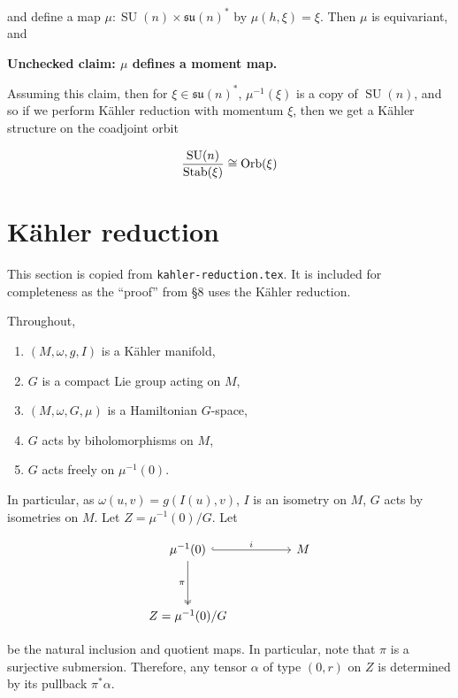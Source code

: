 \documentclass{article}
\DeclareMathOperator{\SU}{SU}
\newcommand{\su}{\mathfrak{su}}
\begin{document}
and define a map \(\mu : \SU(n) \times \su(n)^*\) by \(\mu(h, \xi) = \xi\). Then \(\mu\) is equivariant, and

\textbf{Unchecked claim: \(\mu\) defines a moment map.}

Assuming this claim, then for \(\xi \in \su(n)^*\), \(\mu^{-1}(\xi)\) is a copy of \(\SU(n)\), and so if we perform K\"ahler reduction with momentum \(\xi\), then we get a K\"ahler structure on the coadjoint orbit

\[\frac{\SU(n)}{\Stab(\xi)} \cong \Orb(\xi)\]

\appendix

\section{K\"ahler reduction}

This section is copied from \texttt{kahler-reduction.tex}. It is included for completeness as the ``proof'' from \S 8 uses the K\"ahler reduction.

Throughout,

\begin{enumerate}
    \item \((M, \omega, g, I)\) is a K\"ahler manifold,
    \item \(G\) is a compact Lie group acting on \(M\),
    \item \((M, \omega, G, \mu)\) is a Hamiltonian \(G\)-space,
    \item \(G\) acts by biholomorphisms on \(M\),
    \item \(G\) acts freely on \(\mu^{-1}(0)\).
\end{enumerate}

In particular, as \(\omega(u, v) = g(I(u), v)\), \(I\) is an isometry on \(M\), \(G\) acts by isometries on \(M\). Let \(Z = \mu^{-1}(0)/G\). Let

\[\begin{tikzcd}
	{\mu^{-1}(0)} && M \\
	\\
	{Z=\mu^{-1}(0)/G}
	\arrow["i", hook, from=1-1, to=1-3]
	\arrow["\pi"', two heads, from=1-1, to=3-1]
\end{tikzcd}\]

be the natural inclusion and quotient maps. In particular, note that \(\pi\) is a surjective submersion. Therefore, any tensor \(\alpha\) of type \((0, r)\) on \(Z\) is determined by its pullback \(\pi^*\alpha\).
\end{document}

